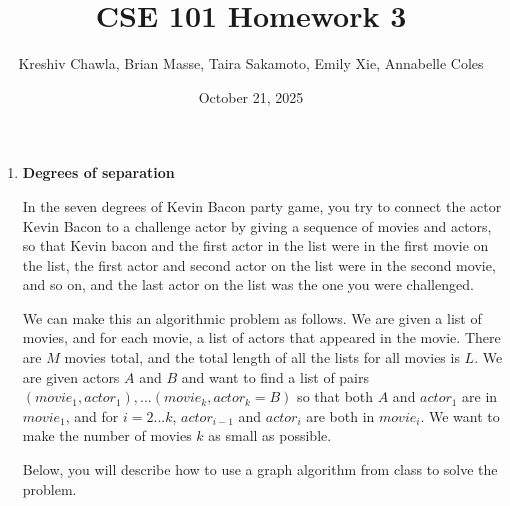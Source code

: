 \documentclass[12pt, letterpaper]{article}
\title{CSE 101 Homework 3}
\author{Kreshiv Chawla, Brian Masse, Taira Sakamoto, Emily Xie, Annabelle Coles}
\date{October 21, 2025}
\begin{document}
\maketitle
\newpage

\begin{enumerate}

\item \textbf{Degrees of separation}

In the seven degrees of Kevin Bacon party game, you try to connect the actor Kevin Bacon to a challenge actor by giving a sequence of movies and actors, so that Kevin bacon and the first actor in the list were in the first movie on the list, the first actor and second actor on the list were in the second movie, and so on, and the last actor on the list was the one you were challenged. 

We can make this an algorithmic problem as follows.
We are given a list of movies, and for each movie, a list of actors that
appeared in the movie.  There are $M$ movies total, and the total length of all the lists for all movies is $L$. We are given actors $A$ and $B$ and want to find a list of pairs $(movie_1,actor_1),...(movie_k,actor_k=B)$ so that
both $A$ and $actor_1$ are in $movie_1$, and for
$i=2...k$, $actor_{i-1}$ and $actor_i$ are
both in $movie_i$.  We want to make the number of movies $k$ as small as possible.  

Below, you will describe how to use a graph algorithm from class to solve the
problem.


\end{enumerate}
\end{document}
